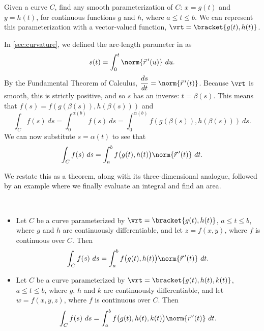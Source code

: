 
Given a curve $C$, find any smooth parameterization of $C$: $x = g(t)$ and $y=h(t)$, for continuous functions $g$ and $h$, where $a\leq t\leq b$. We can represent this parameterization with a vector-valued function, $\vrt =\bracket{g(t),h(t)}$.

In \autoref{sec:curvature}, we defined the arc-length parameter in  as 
\[s(t) = \int_0^t \norm{\vec r\,'(u)}\ du.\]
By the Fundamental Theorem of Calculus, $\dfrac{ds}{dt} = \norm{\vec r\,'(t)}$. Because $\vrt$ is smooth, this is strictly positive, and so $s$ has an inverse: $t=\beta(s)$.  This means that $f(s)=f(g(\beta(s)),h(\beta(s)))$ and
%
\[\int_C f(s)\ ds = \int_0^{\alpha(b)} f(s)\ ds = \int_0^{\alpha(b)}f(g(\beta(s)),h(\beta(s)))\ ds. \]
We can now substitute $s=\alpha(t)$ to see that
\[\int_C f(s)\ ds = \int_a^bf\bigl(g(t),h(t)\bigr)\norm{\vec r\,'(t)}\ dt.\]

We restate this as a theorem, along with its three-dimensional analogue, followed by an example where we finally evaluate an integral and find an area.

\begin{theorem}\label{thm:line1}
%
\mbox{}\\[-2\baselineskip]\begin{itemize}
	\item Let $C$ be a curve parameterized by $\vrt =\bracket{g(t),h(t)}$, $a\leq t\leq b$, where $g$ and $h$ are continuously differentiable, and let $z=f(x,y)$, where $f$ is continuous over $C$. Then
\[\int_Cf(s)\ ds = \int_a^bf\bigl(g(t),h(t)\bigr)\norm{\vec r\,'(t)}\ dt.\]
	\item Let $C$ be a curve parameterized by $\vrt =\bracket{g(t),h(t),k(t)}$, $a\leq t\leq b$, where $g$, $h$ and $k$ are continuously differentiable, and let $w=f(x,y,z)$, where $f$ is continuous over $C$. Then
\[\int_Cf(s)\ ds = \int_a^bf\bigl(g(t),h(t),k(t)\bigr)\norm{\vec r\,'(t)}\ dt.\]
\end{itemize}
\end{theorem}

